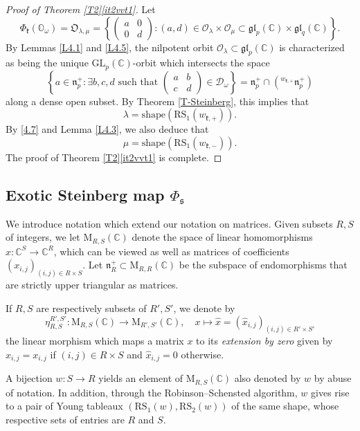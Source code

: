 \documentclass[ALCO,Unicode]{cedram}
\newcommand{\fk}{\mathfrak{k}}
\newcommand{\fs}{\mathfrak{s}}
\newcommand{\fn}{\mathfrak{n}}
\newcommand{\gl}{\mathfrak{gl}}
\newcommand{\RS}{\mathrm{RS}}
\newcommand{\shape}{\mathrm{shape}}
\newcommand{\Mat}{\mathrm{M}}
\newcommand{\Xorbit}{\mathbb{O}}
\newcommand{\Nkorbit}{\mathfrak{O}}
\newcommand{\condir}{\mathcal{D}}
\newcommand{\GL}{\mathrm{GL}}
\newcommand{\mC}{\mathbb{C}}
\begin{document}
\begin{proof}[Proof of Theorem \ref{T2}\ref{it2vvt1}]
Let
\[\Phi_\fk(\Xorbit_\omega)=\Nkorbit_{\lambda,\mu}=\left\{\begin{pmatrix} a & 0\\ 0 & d \end{pmatrix}:(a,d)\in\mathcal{O}_\lambda\times\mathcal{O}_\mu\subset\gl_p(\mC)\times\gl_q(\mC)\right\}.\]
By Lemmas \ref{L4.1} and \ref{L4.5}, the nilpotent orbit $\mathcal{O}_\lambda\subset\gl_p(\mC)$ is characterized as being the unique $\GL_p(\mC)$-orbit which intersects the space
\[\left\{a\in\fn_p^+:\exists b,c,d\mbox{ such that }\begin{pmatrix} a & b\\ c & d \end{pmatrix}\in\condir_\omega\right\}=\fn_p^+\cap({}^{w_{\fk,+}}\fn_p^+)\]
along a dense open subset. By Theorem \ref{T-Steinberg}, this implies that
\[\lambda=\shape(\RS_1(w_{\fk,+})).\]
By \eqref{4.7} and Lemma \ref{L4.3}, we also deduce that
\[\mu=\shape(\RS_1(w_{\fk,-})).\]
The proof of Theorem \ref{T2}\ref{it2vvt1} is complete.
\end{proof}

\subsection{Exotic Steinberg map $\Phi_\fs$}

We introduce notation which extend our notation on matrices.
Given subsets $R,S$ of integers, we let $\Mat_{R,S}(\mC)$ denote the space of linear homomorphisms $x:\mC^S\to \mC^R$, which can be viewed as well as matrices of coefficients $(x_{i,j})_{(i,j)\in R\times S}$.
Let $\fn_R^+\subset\Mat_{R,R}(\mC)$ be the subspace of endomorphisms that are strictly upper triangular as matrices. %

If $R,S$ are respectively subsets of $R',S'$, we denote by
\begin{equation}
\label{eta}
\eta_{R,S}^{R',S'}:\Mat_{R,S}(\mC)\to\Mat_{R',S'}(\mC),\quad x\mapsto \hat{x}=(\hat{x}_{i,j})_{(i,j)\in R'\times S'}
\end{equation}
the linear morphism which maps a matrix $x$ to its {\em extension by zero} given by
$\hat{x}_{i,j}=x_{i,j}$ if $(i,j)\in R\times S$ and $\hat{x}_{i,j}=0$ otherwise.

A bijection $w:S\to R$ yields an element of $\Mat_{R,S}(\mC)$ also denoted by $w$ by abuse of notation. In addition, through the Robinson--Schensted algorithm, $w$ gives rise to a pair of Young tableaux $(\RS_1(w),\RS_2(w))$ of the same shape, whose respective sets of entries are $R$ and $S$.
\end{document}
